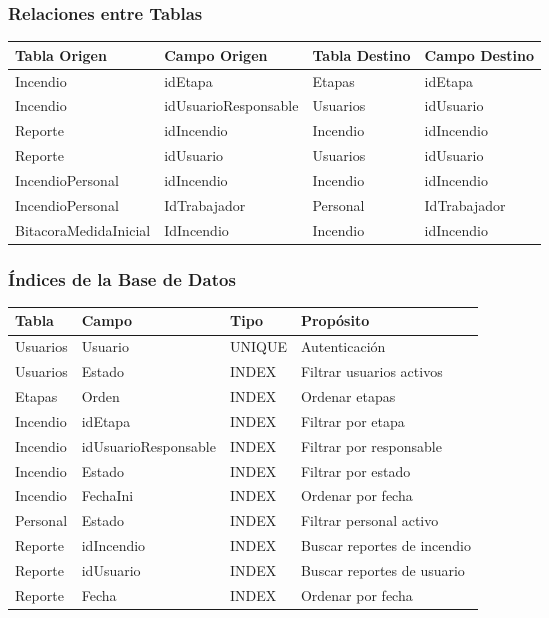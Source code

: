 \subsubsection{Relaciones entre Tablas}
\begin{longtable}{|p{4cm}|p{3cm}|p{3cm}|p{3cm}|}
    \hline
    \textbf{Tabla Origen} & \textbf{Campo Origen} & \textbf{Tabla Destino} & \textbf{Campo Destino} \\ \hline
    Incendio & idEtapa & Etapas & idEtapa \\ \hline
    Incendio & idUsuarioResponsable & Usuarios & idUsuario \\ \hline
    Reporte & idIncendio & Incendio & idIncendio \\ \hline
    Reporte & idUsuario & Usuarios & idUsuario \\ \hline
    IncendioPersonal & idIncendio & Incendio & idIncendio \\ \hline
    IncendioPersonal & IdTrabajador & Personal & IdTrabajador \\ \hline
    BitacoraMedidaInicial & IdIncendio & Incendio & idIncendio \\ \hline
\end{longtable}

\subsubsection{Índices de la Base de Datos}
\begin{longtable}{|p{4cm}|p{3cm}|p{3cm}|p{3cm}|}
    \hline
    \textbf{Tabla} & \textbf{Campo} & \textbf{Tipo} & \textbf{Propósito} \\ \hline
    Usuarios & Usuario & UNIQUE & Autenticación \\ \hline
    Usuarios & Estado & INDEX & Filtrar usuarios activos \\ \hline
    Etapas & Orden & INDEX & Ordenar etapas \\ \hline
    Incendio & idEtapa & INDEX & Filtrar por etapa \\ \hline
    Incendio & idUsuarioResponsable & INDEX & Filtrar por responsable \\ \hline
    Incendio & Estado & INDEX & Filtrar por estado \\ \hline
    Incendio & FechaIni & INDEX & Ordenar por fecha \\ \hline
    Personal & Estado & INDEX & Filtrar personal activo \\ \hline
    Reporte & idIncendio & INDEX & Buscar reportes de incendio \\ \hline
    Reporte & idUsuario & INDEX & Buscar reportes de usuario \\ \hline
    Reporte & Fecha & INDEX & Ordenar por fecha \\ \hline
\end{longtable}

